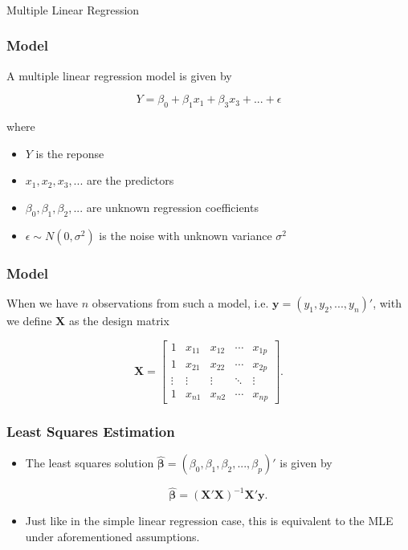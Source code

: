 \begin{frame}[fragile]\frametitle{}
\begin{center}
{\Large Multiple Linear Regression}

\end{center}
\end{frame}


\begin{frame}[fragile]\frametitle{Model}

A multiple linear regression model is given by

\begin{displaymath}
Y = \beta_{0}+\beta_{1}x_{1}+\beta_{3}x_{3}+...+\epsilon
\end{displaymath}

where
\begin{itemize}
\item $Y$ is the reponse
\item $x_{1},x_{2},x_{3},...$ are the predictors
\item $\beta_{0},\beta_{1},\beta_{2},...$ are unknown regression coefficients
\item $\epsilon\sim N(0,\sigma^{2})$ is the noise with unknown variance $\sigma^{2}$
\end{itemize}
\end{frame}

\begin{frame}[fragile]\frametitle{Model}

When we have $n$ observations from such a model, i.e. $\mathbf{y}=(y_{1},y_{2},...,y_{n})'$, with we define $\mathbf{X}$ as the design matrix

\begin{displaymath}
\mathbf{X}=\left[\begin{array}{ccccc}1 & x_{11} & x_{12} & \cdots & x_{1p} \\1 & x_{21} & x_{22} & \cdots & x_{2p} \\ \vdots & \vdots & \vdots & \ddots & \vdots \\1 & x_{n1} & x_{n2} & \cdots & x_{np}\end{array}\right].
\end{displaymath}
\end{frame}

\begin{frame}[fragile]\frametitle{Least Squares Estimation}

\begin{itemize}
\item The least squares solution $\hat{\boldsymbol\beta}=(\beta_{0},\beta_{1},\beta_{2},...,\beta_{p})'$ is given by

\begin{displaymath}
\hat{\boldsymbol\beta}=(\mathbf{X}'\mathbf{X})^{-1}\mathbf{X}'\mathbf{y}.
\end{displaymath}
\item Just like in the simple linear regression case, this is equivalent to the MLE under aforementioned assumptions.
\end{itemize}
\end{frame}

